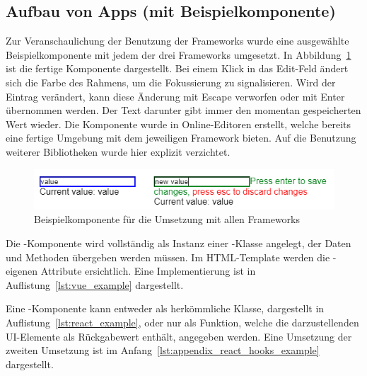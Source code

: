 \subsection{Aufbau von Apps (mit Beispielkomponente)}
Zur Veranschaulichung der Benutzung der Frameworks wurde eine ausgewählte Beispielkomponente mit jedem der drei Frameworks umgesetzt. In Abbildung~\ref{fig:example_component} ist die fertige Komponente dargestellt. Bei einem Klick in das Edit-Feld ändert sich die Farbe des Rahmens, um die Fokussierung zu signalisieren. Wird der Eintrag verändert, kann diese Änderung mit Escape verworfen oder mit Enter übernommen werden. Der Text darunter gibt immer den momentan gespeicherten Wert wieder. Die Komponente wurde in Online-Editoren erstellt, welche bereits eine fertige Umgebung mit dem jeweiligen Framework bieten. Auf die Benutzung weiterer Bibliotheken wurde hier explizit verzichtet.

\begin{figure}
    \centering
    \captionsetup{justification=centering}
    \includegraphics{figures/example_component.png}
        \caption{Beispielkomponente für die Umsetzung mit allen Frameworks}\label{fig:example_component}
\end{figure}

Die -Komponente wird vollständig als Instanz einer -Klasse angelegt, der Daten und Methoden übergeben werden müssen. Im HTML-Template werden die -eigenen Attribute ersichtlich. Eine Implementierung ist in Auflistung~\ref{lst:vue_example} dargestellt.



Eine -Komponente kann entweder als herkömmliche Klasse, dargestellt in Auflistung~\ref{lst:react_example}, oder nur als Funktion, welche die darzustellenden UI-Elemente als Rückgabewert enthält, angegeben werden. Eine Umsetzung der zweiten Umsetzung ist im Anfang~\ref{lst:appendix_react_hooks_example} dargestellt.



